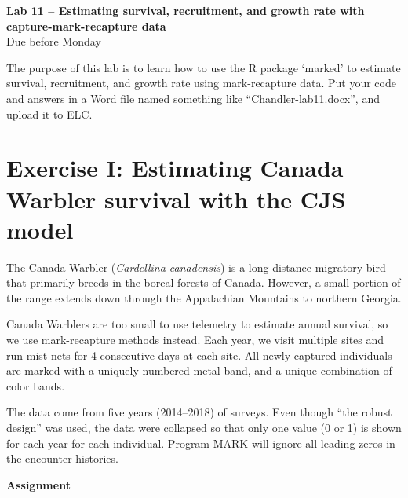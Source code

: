 \documentclass[12pt]{article}\usepackage[]{graphicx}\usepackage[]{color}
\begin{document}
{
  \Large
  \centering
  {\bf Lab 11 -- Estimating survival, recruitment, and growth rate
    with capture-mark-recapture data} \\
  Due before Monday \\
}

\vspace{10pt}

The purpose of this lab is to learn how to use the R package `marked' to
estimate survival, recruitment, and growth rate using mark-recapture
data. Put your code and answers in a Word file named something like
``Chandler-lab11.docx'', and upload it to ELC.



\section*{\large Exercise I: Estimating Canada Warbler survival with the CJS model}



The Canada Warbler ({\it Cardellina canadensis}) is a long-distance
migratory bird that primarily breeds in the boreal forests of
Canada. However, a small portion of the range extends down through the
Appalachian Mountains to northern Georgia.

Canada Warblers are too small to use telemetry to estimate annual
survival, so we use mark-recapture methods instead. Each year, we
visit multiple sites and run mist-nets for 4 consecutive days at each
site. All newly captured individuals are marked with a uniquely
numbered metal band, and a unique combination of color bands.

The data come from five years (2014--2018) of surveys. Even though
``the robust design'' was used, the data were collapsed so that only
one value (0 or 1) is shown for each year for each individual. Program
MARK will ignore all leading zeros in the encounter histories.

{\bf Assignment}
\end{document}
